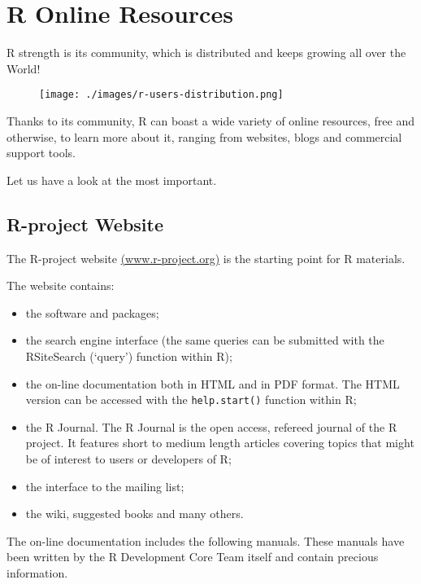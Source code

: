 \documentclass[]{book}
\providecommand{\tightlist}{%
  \setlength{\itemsep}{0pt}\setlength{\parskip}{0pt}}
\def\tightlist{}
\begin{document}
\clearpage

\section{R Online Resources}\label{r-online-resources}

R strength is its community, which is distributed and keeps growing all
over the World!

\begin{figure}[htbp]
\centering
\texttt{[image: ./images/r-users-distribution.png]}
\caption{}
\end{figure}

Thanks to its community, R can boast a wide variety of online resources,
free and otherwise, to learn more about it, ranging from websites, blogs
and commercial support tools.

Let us have a look at the most important.

\subsection{R-project Website}\label{r-project-website}

The R-project website
\href{http://www.r-project.org/}{(www.r-project.org)} is the starting
point for R materials.

The website contains:

\begin{itemize}
\tightlist
\item
  the software and packages;
\item
  the search engine interface (the same queries can be submitted with
  the RSiteSearch (`query') function within R);
\item
  the on-line documentation both in HTML and in PDF format. The HTML
  version can be accessed with the \texttt{help.start()} function within
  R;
\item
  the R Journal. The R Journal is the open access, refereed journal of
  the R project. It features short to medium length articles covering
  topics that might be of interest to users or developers of R;
\item
  the interface to the mailing list;
\item
  the wiki, suggested books and many others.
\end{itemize}

The on-line documentation includes the following manuals. These manuals
have been written by the R Development Core Team itself and contain
precious information.
\end{document}
